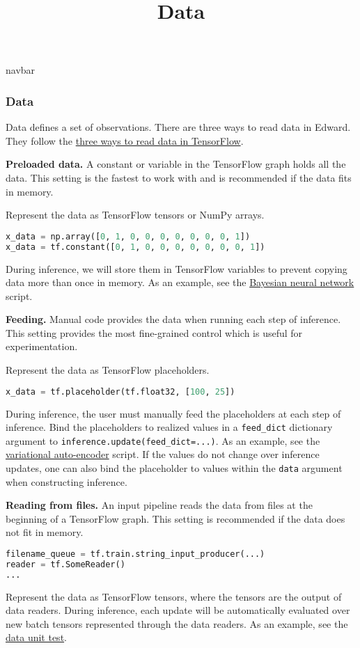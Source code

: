 \title{Data}

{{navbar}}

\subsubsection{Data}

Data defines a set of observations. There are three ways
to read data in Edward. They follow the
\href{https://www.tensorflow.org/versions/master/how_tos/reading_data/index.html}
{three ways to read data in TensorFlow}.

\textbf{Preloaded data.}
A constant or variable in the TensorFlow graph holds all the data.
This setting is the fastest to work with and is recommended if the
data fits in memory.

Represent the data as TensorFlow tensors or NumPy arrays.

\begin{lstlisting}[language=Python]
x_data = np.array([0, 1, 0, 0, 0, 0, 0, 0, 0, 1])
x_data = tf.constant([0, 1, 0, 0, 0, 0, 0, 0, 0, 1])
\end{lstlisting}

During inference, we will store them in TensorFlow variables to
prevent copying data more than once in memory. As an example, see the
\href{https://github.com/blei-lab/edward/blob/master/examples/bayesian_nn.py}
{Bayesian neural network} script.

\textbf{Feeding.}
Manual code provides the data when running each step of inference.
This setting provides the most fine-grained control which is useful
for experimentation.

Represent the data as TensorFlow placeholders.

\begin{lstlisting}[language=Python]
x_data = tf.placeholder(tf.float32, [100, 25])
\end{lstlisting}

During inference, the user must manually feed the placeholders at each
step of inference. Bind the placeholders to realized values in a
\texttt{feed_dict} dictionary argument to
\texttt{inference.update(feed_dict={...})}. As an example, see the
\href{https://github.com/blei-lab/edward/blob/master/examples/vae.py}
{variational auto-encoder} script.
If the values do not change over inference updates, one can also bind
the placeholder to values within the \texttt{data} argument when
constructing inference.

\textbf{Reading from files.}
An input pipeline reads the data from files at the beginning of a
TensorFlow graph. This setting is recommended if the data does not
fit in memory.

\begin{lstlisting}[language=Python]
filename_queue = tf.train.string_input_producer(...)
reader = tf.SomeReader()
...
\end{lstlisting}

Represent the data as TensorFlow tensors, where the tensors are the
output of data readers. During inference, each update will be
automatically evaluated over new batch tensors represented through
the data readers. As an example, see the
\href{https://github.com/blei-lab/edward/blob/master/tests/test-inferences/test_data.py}
{data unit test}.
